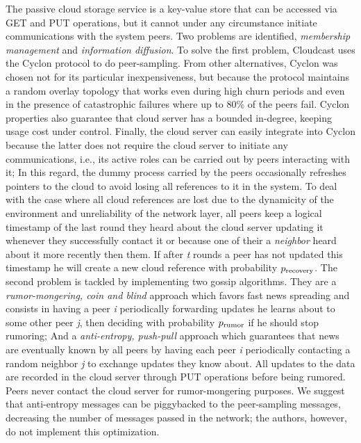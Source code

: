 \documentclass[runningheads]{llncs}
\begin{document}
The passive cloud storage service is a key-value store that can be accessed via GET and PUT operations, but it cannot under any circumstance initiate communications with the system peers. Two problems are identified, \textit{membership management} and \textit{information diffusion}. To solve the first problem, Cloudcast uses the Cyclon protocol to do peer-sampling. From other alternatives, Cyclon was chosen not for its particular inexpensiveness, but because the protocol maintains a random overlay topology that works even during high churn periods and even in the presence of catastrophic failures where up to 80\% of the peers fail. Cyclon properties also guarantee that cloud server has a bounded in-degree, keeping usage cost under control. Finally, the cloud server can easily integrate into Cyclon because the latter does not require the cloud server to initiate any communications, i.e., its active roles can be carried out by peers interacting with it; In this regard, the dummy process carried by the peers occasionally refreshes pointers to the cloud to avoid losing all references to it in the system. To deal with the case where all cloud references are lost due to the dynamicity of the environment and unreliability of the network layer, all peers keep a logical timestamp of the last round they heard about the cloud server updating it whenever they successfully contact it or because one of their a \textit{neighbor} heard about it more recently then them. If after \textit{t} rounds a peer has not updated this timestamp he will create a new cloud reference with probability $p\textsubscript{recovery}$. The second problem is tackled by implementing two gossip algorithms. They are a \textit{rumor-mongering, coin and blind} approach which favors fast news spreading and consists in having a peer \textit{i} periodically forwarding updates he learns about to some other peer \textit{j}, then deciding with probability $p\textsubscript{rumor}$ if he should stop rumoring; And a \textit{anti-entropy, push-pull} approach which guarantees that news are eventually known by all peers by having each peer \textit{i} periodically contacting a random neighbor \textit{j} to exchange updates they know about. All updates to the data are recorded in the cloud server through PUT operations before being rumored. Peers never contact the cloud server for rumor-mongering purposes. We suggest that anti-entropy messages can be piggybacked to the peer-sampling messages, decreasing the number of messages passed in the network; the authors, however, do not implement this optimization.
\end{document}
